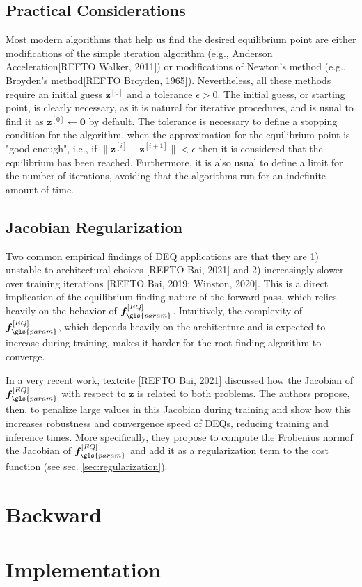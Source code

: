 \subsection{Practical Considerations}

Most modern algorithms that help us find the desired equilibrium point are either modifications of the simple iteration algorithm (e.g., Anderson Acceleration[REFTO Walker, 2011]) or modifications of Newton's method (e.g., Broyden's method[REFTO Broyden, 1965]).
Nevertheless, all these methods require an initial guess $\bm{z}^{[0]}$ and a tolerance $\epsilon>0$. 
The initial guess, or starting point, is clearly necessary, as it is natural for iterative procedures, and is usual to find it as $\bm{z}^{[0]}\gets \bm{0}$ by default.
The tolerance is necessary to define a stopping condition for the algorithm, when the approximation for the equilibrium point is "good enough", i.e., if $\|\bm{z}^{[i]}-\bm{z}^{[i+1]}\|<\epsilon$ then it is considered that the equilibrium has been reached.
Furthermore, it is also usual to define a limit for the number of iterations, avoiding that the algorithms run for an indefinite amount of time.

\subsection{Jacobian Regularization}

Two common empirical findings of \gls{DEQ} applications are that they are 1) unstable to architectural choices [REFTO Bai, 2021] and 2) increasingly slower over training iterations [REFTO Bai, 2019; Winston, 2020].
This is a direct implication of the equilibrium-finding nature of the forward pass, which relies heavily on the behavior of $\bm{f}_{\gls{param}}^{[EQ]}$.
Intuitively, the complexity of $\bm{f}_{\gls{param}}^{[EQ]}$, which depends heavily on the architecture and is expected to increase during training, makes it harder for the root-finding algorithm to converge.

In a very recent work, textcite [REFTO Bai, 2021] discussed how the Jacobian of $\bm{f}_{\gls{param}}^{[EQ]}$ with respect to $\bm{z}$ is related to both problems.
The authors propose, then, to penalize large values in this Jacobian during training and show how this increases robustness and convergence speed of \gls{DEQ}s, reducing training and inference times.
More specifically, they propose to compute the Frobenius norm\footnotemark of the Jacobian of $\bm{f}_{\gls{param}}^{[EQ]}$ and add it as a regularization term to the cost function (see sec. \ref{sec:regularization}).

\section{Backward}

\section{Implementation}

